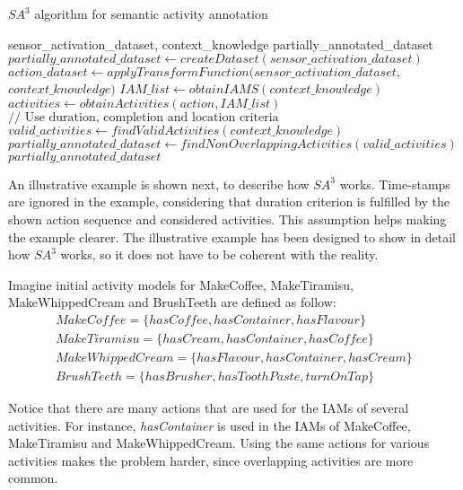 \begin{algorithm}
 \caption{$SA^3$ algorithm for semantic activity annotation}
 \label{alg:sa3}
 \begin{algorithmic}
 \REQUIRE sensor\_activation\_dataset, context\_knowledge
 \ENSURE partially\_annotated\_dataset
 \STATE $partially\_annotated\_dataset \leftarrow createDataset(sensor\_activation\_dataset)$
 \STATE $action\_dataset \leftarrow applyTransformFunction(sensor\_activation\_dataset,$ 
 $context\_knowledge)$
 \STATE $IAM\_list \leftarrow obtainIAMS(context\_knowledge)$
    \STATE $activities \leftarrow obtainActivities(action, IAM\_list)$
  \ENDIF
    \STATE $// \text{ Use duration, completion and location criteria}$
    \STATE $valid\_activities \leftarrow findValidActivities(context\_knowledge)$
  \ENDFOR
 \ENDFOR
 \STATE $partially\_annotated\_dataset \leftarrow findNonOverlappingActivities(valid\_activities)$
 \RETURN $partially\_annotated\_dataset$
 \end{algorithmic}
\end{algorithm}

An illustrative example is shown next, to describe how $SA^3$ works. Time-stamps are ignored in the example, considering that duration criterion is fulfilled by the shown action sequence and considered activities. This assumption helps making the example clearer. The illustrative example has been designed to show in detail how $SA^3$ works, so it does not have to be coherent with the reality. 

Imagine initial activity models for MakeCoffee, MakeTiramisu, MakeWhippedCream and BrushTeeth are defined as follow:
 \begin{equation*}
  \begin{split}
  MakeCoffee =\{hasCoffee, hasContainer, hasFlavour\} \\
  MakeTiramisu = \{hasCream, hasContainer, hasCoffee\} \\
  MakeWhippedCream = \{hasFlavour, hasContainer, hasCream\} \\
  BrushTeeth = \{hasBrusher, hasToothPaste, turnOnTap\} 
  \end{split}
 \end{equation*} 
 
Notice that there are many actions that are used for the IAMs of several activities. For instance, \textit{hasContainer} is used in the IAMs of MakeCoffee, MakeTiramisu and MakeWhippedCream. Using the same actions for various activities makes the problem harder, since overlapping activities are more common.

